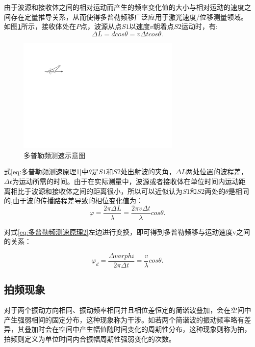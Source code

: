 由于波源和接收体之间的相对运动而产生的频率变化值的大小与相对运动的速度之间存在定量推导关系，从而使得多普勒频移广泛应用于激光速度/位移测量领域。如图\ref{fig:多普勒频测速示意图}所示，接收体处在\(P\)点，波源从点\(S1\)以速度\(v\)朝着点\(S2\)运动时，有:
\begin{equation}\label{eq:多普勒频测速原理1}
    \Delta L=dcos\theta=v\Delta tcos\theta.
\end{equation}
\begin{figure}[htb]
    \centering
    \includegraphics[width=8cm]{fig/2-fig/多普勒频测速示意图.drawio.pdf}
    \caption{多普勒频测速示意图}
    \label{fig:多普勒频测速示意图}
  \end{figure}

式\eqref{eq:多普勒频测速原理1}中\(\theta\)是\(S1\)和\(S2\)处出射波的夹角，\(\Delta L\)两处位置的波程差，\(\Delta t\)为运动所需的时间。由于在实际测量中，波源或者接收体在单位时间内运动距离相比于波源和接收体之间的距离很小，所以可以近似认为\(S1\)和\(S2\)两处的\(\theta\)是相同的\cite{百度百科-多普勒频移},由于波的传播路程差导致的相位变化值为：
\begin{equation}\label{eq:多普勒频测速原理2}
    \varphi=\frac{2\pi \Delta L}{\lambda}=\frac{2\pi v\Delta t}{\lambda}cos\theta.
\end{equation}


对式\eqref{eq:多普勒频测速原理2}左边进行变换，即可得到多普勒频移与运动速度v之间的关系：

\begin{equation}\label{eq:多普勒频测速原理3}
    \varphi_d=\frac{\Delta varphi}{2\pi \Delta t}=\frac{v}{\lambda}cos\theta.
\end{equation}



\subsection{拍频现象}
对于两个振动方向相同、振动频率相同并且相位差恒定的简谐波叠加，会在空间中产生强弱相间的固定分布，这种现象称为干涉。如若两个简谐波的振动频率略有差异，其叠加时会在空间中产生幅值随时间变化的周期性分布，这种现象则称为拍\cite{基于拍频测量温度和旋光角的方法研究}，拍频则定义为单位时间内合振幅周期性强弱变化的次数。

